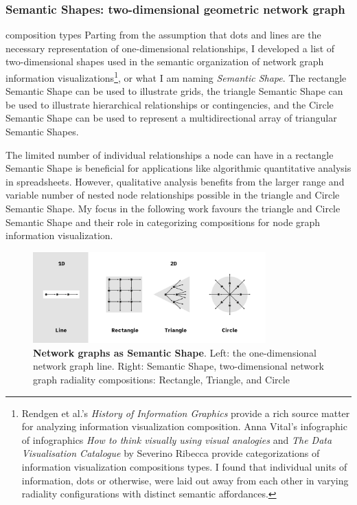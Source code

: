 \subsubsection{Semantic Shapes: two-dimensional geometric network graph} composition types
Parting from the assumption that dots and lines are the necessary representation of one-dimensional relationships, I developed a list of two-dimensional shapes used in the semantic organization of network graph information visualizations\footnote{Rendgen et al.’s \textit{History of Information Graphics} \citep{rendgen_history_2019} provide a rich source matter for analyzing information visualization composition. Anna Vital’s infographic of infographics \textit{How to think visually using visual analogies} \citep{vital_how_2018} and \textit{The Data Visualisation Catalogue} by Severino Ribecca \citep{ribecca_data_2017} provide categorizations of information visualization compositions types. I found that individual units of information, dots or otherwise, were laid out away from each other in varying radiality configurations with distinct semantic affordances.}, or what I am naming \textit{Semantic Shape}. The rectangle Semantic Shape can be used to illustrate grids, the triangle Semantic Shape can be used to illustrate hierarchical relationships or contingencies, and the Circle Semantic Shape can be used to represent a multidirectional array of triangular Semantic Shapes.
   


The limited number of individual relationships a node can have in a rectangle Semantic Shape is beneficial for applications like algorithmic quantitative analysis in spreadsheets. However, qualitative analysis benefits from the larger range and variable number of nested node relationships possible in the triangle and Circle Semantic Shape. My focus in the following work favours the triangle and Circle Semantic Shape and their role in categorizing compositions for node graph information visualization.


\FloatBarrier

\begin{figure}[h]
    \centering
    \includegraphics[width=0.8\textwidth]{figures/5.1.png}
    \caption[Network graphs as Semantic Shape]{\textbf{Network graphs as Semantic Shape}. Left: the one-dimensional network graph line. Right: Semantic Shape, two-dimensional network graph radiality compositions: Rectangle, Triangle, and Circle}
    \label{f5.1}
\end{figure}


